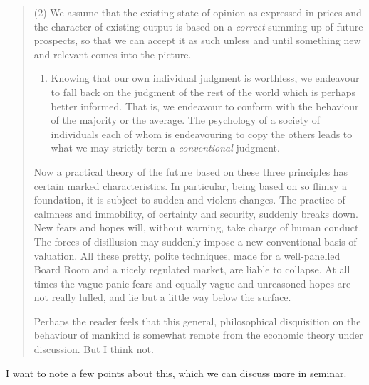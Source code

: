 \documentclass[
  11pt,
  letterpaper,
  DIV=11,
  numbers=noendperiod,
  oneside]{scrartcl}
\providecommand{\tightlist}{%
  \setlength{\itemsep}{0pt}\setlength{\parskip}{0pt}}\usepackage{longtable,booktabs,array}
\begin{document}
\begin{quote}
(2) We assume that the existing state of opinion as expressed in prices
and the character of existing output is based on a \emph{correct}
summing up of future prospects, so that we can accept it as such unless
and until something new and relevant comes into the picture.

\begin{enumerate}
\def\labelenumi{(\arabic{enumi})}
\setcounter{enumi}{2}
\tightlist
\item
  Knowing that our own individual judgment is worthless, we endeavour to
  fall back on the judgment of the rest of the world which is perhaps
  better informed. That is, we endeavour to conform with the behaviour
  of the majority or the average. The psychology of a society of
  individuals each of whom is endeavouring to copy the others leads to
  what we may strictly term a \emph{conventional} judgment.
\end{enumerate}

Now a practical theory of the future based on these three principles has
certain marked characteristics. In particular, being based on so flimsy
a foundation, it is subject to sudden and violent changes. The practice
of calmness and immobility, of certainty and security, suddenly breaks
down. New fears and hopes will, without warning, take charge of human
conduct. The forces of disillusion may suddenly impose a new
conventional basis of valuation. All these pretty, polite techniques,
made for a well-panelled Board Room and a nicely regulated market, are
liable to collapse. At all times the vague panic fears and equally vague
and unreasoned hopes are not really lulled, and lie but a little way
below the surface.

Perhaps the reader feels that this general, philosophical disquisition
on the behaviour of mankind is somewhat remote from the economic theory
under discussion. But I think not.
\end{quote}

I want to note a few points about this, which we can discuss more in
seminar.
\end{document}
